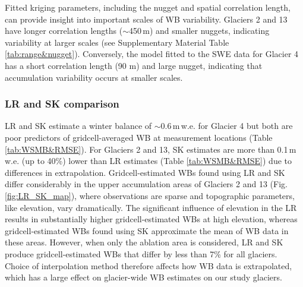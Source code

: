 \documentclass[twocolumn, letterpaper]{igs}
\begin{document}
Fitted kriging parameters, including the nugget and spatial correlation length, can provide insight into important scales of WB variability. Glaciers 2 and 13 have longer correlation lengths ($\sim$450\,m) and smaller nuggets, indicating variability at larger scales (see Supplementary Material Table \ref{tab:range&nugget}). Conversely, the model fitted to the SWE data for Glacier 4 has a short correlation length (90 m) and large nugget, indicating that accumulation variability occurs at smaller scales. 

\subsubsection{LR and SK comparison}
 
LR and SK estimate a winter balance of $\sim$0.6\,m\,w.e. for Glacier 4 but both are poor predictors of gridcell-averaged WB at measurement locations (Table \ref{tab:WSMB&RMSE}). For Glaciers 2 and 13, SK estimates are more than 0.1\,m\,w.e. (up to 40\%) lower than LR estimates (Table \ref{tab:WSMB&RMSE}) due to differences in extrapolation. Gridcell-estimated WBs found using LR and SK differ considerably in the upper accumulation areas of Glaciers 2 and 13 (Fig. \ref{fig:LR_SK_map}), where observations are sparse and topographic parameters, like elevation, vary dramatically. The significant influence of elevation in the LR results in substantially higher gridcell-estimated WBs at high elevation, whereas gridcell-estimated WBs found using SK approximate the mean of WB data in these areas. However, when only the ablation area is considered, LR and SK produce gridcell-estimated WBs that differ by less than 7\% for all glaciers. Choice of interpolation method therefore affects how WB data is extrapolated, which has a large effect on glacier-wide WB estimates on our study glaciers. 
\end{document}
